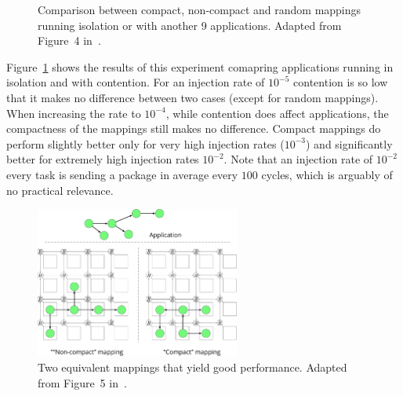 \begin{figure}[h]
	\centering
	\caption{Comparison between compact, non-compact and random mappings running isolation or with another 9 applications. Adapted from Figure~4 in~\cite{goens_samos19}.}
	\label{fig:compact_cases}
\end{figure}

Figure~\ref{fig:compact_cases} shows the results of this experiment comapring applications running in isolation and with contention.
For an injection rate of $10^{-5}$ contention is so low that it makes no difference between two cases (except for random mappings).
When increasing the rate to $10^{-4}$, while contention does affect applications, the compactness of the mappings still makes no difference.
Compact mappings do perform slightly better only for very high injection rates ($10^{-3}$) and significantly better for extremely high injection rates $10^{-2}$.
Note that an injection rate of $10^{-2}$ every task is sending a package in average every $100$ cycles, which is arguably of no practical relevance. 

\begin{figure}[th]
	\centering
	\includegraphics[width=0.6\textwidth]{figures/topology_vs_geometry.pdf}
	\caption{Two equivalent mappings that yield good performance. Adapted from Figure~5 in~\cite{goens_samos19}.}
	\label{fig:topology_vs_geometry}
\end{figure}

